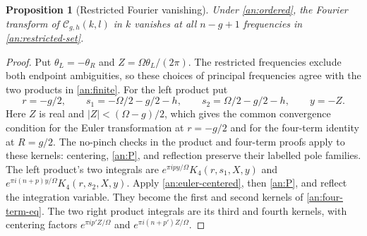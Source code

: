 \documentclass[11pt]{article}
\numberwithin{equation}{section}
\newtheorem{proposition}[theorem]{Proposition}
\theoremstyle{definition}
\theoremstyle{remark}
\begin{document}
\begin{proposition}[Restricted Fourier vanishing]\label{an:restricted}
Under \eqref{an:ordered}, the Fourier transform of
$\mathcal C_{g,h}(k,l)$ in $k$ vanishes at all $n-g+1$ frequencies
in \eqref{an:restricted-set}.
\end{proposition}

\begin{proof}
Put $\theta_L=-\theta_R$ and $Z=\Omega\theta_L/(2\pi)$.
The restricted frequencies exclude both endpoint ambiguities, so these
choices of principal frequencies agree with the two products in
\eqref{an:finite}.  For the left product put
\[
 r=-g/2,\qquad s_1=-\Omega/2-g/2-h,\qquad
 s_2=\Omega/2-g/2-h,\qquad y=-Z.
\]
Here $Z$ is real and $|Z|<(\Omega-g)/2$, which gives the common
convergence condition for the Euler transformation at $r=-g/2$ and
for the four-term identity at $R=g/2$.  The no-pinch checks in the
product and four-term proofs apply to these kernels: centering,
\eqref{an:P}, and reflection preserve their labelled pole families.
The left product's two integrals are
$e^{\pi ipy/\Omega}K_4(r,s_1,X,y)$ and
$e^{\pi i(n+p)y/\Omega}K_4(r,s_2,X,y)$.
Apply \eqref{an:euler-centered}, then \eqref{an:P}, and reflect
the integration variable.  They become the first and second kernels
of \eqref{an:four-term-eq}.  The two right product integrals are
its third and fourth kernels, with centering factors
$e^{\pi ip'Z/\Omega}$ and $e^{\pi i(n+p')Z/\Omega}$.


\end{proof}
\end{document}
